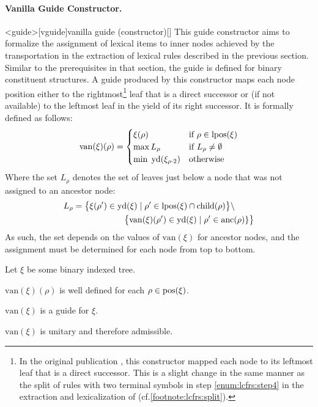 \documentclass[../../document.tex]{subfiles}
\begin{document}
    \paragraph{Vanilla Guide Constructor.}<guide>[vguide]{vanilla guide (constructor)}[]
    This guide constructor aims to formalize the assignment of lexical items to inner nodes achieved by the transportation in the extraction of lexical  rules described in the previous section.
    Similar to the prerequisites in that section, the guide is defined for binary constituent structures.
    A guide produced by this constructor maps each node position either to the rightmost\footnote{
        In the original publication \citep{Rup22}, this constructor mapped each node to its leftmost leaf that is a direct successor.
        This is a slight change in the same manner as the split of rules with two terminal symbols in step \ref{enum:lcfrs:step4} in the extraction and lexicalization of  (cf.\@ \cref{footnote:lcfrs:split}).
    } leaf that is a direct successor or (if not available) to the leftmost leaf in the yield of its right successor.
    It is formally defined as follows:
    \[
    \mathrm{van}(\xi)(\rho) = \begin{cases}
        \xi(\rho)   & \text{if $\rho \in \operatorname{lpos}(\xi)$}\\
        \max L_\rho & \text{if $L_\rho \neq \emptyset$} \\
        \min\;\operatorname{yd}(\xi_{\rho\cdot 2}) &\text{otherwise}
    \end{cases}
    \]
    Where the set \(L_\rho\) denotes the set of leaves just below a node that was not assigned to an ancestor node:
    \begin{align*}
        L_\rho &= \big\{\xi(\rho') \in \operatorname{yd}(\xi) \mid \rho' \in \operatorname{lpos}(\xi) \cap \operatorname{child}(\rho) \big\} \setminus \\
        &\qquad\qquad\qquad  \big\{\mathrm{van}(\xi)(\rho') \in \operatorname{yd}(\xi) \mid \rho' \in \operatorname{anc}(\rho)\} \big\}
    \end{align*}
    As such, the set depends on the values of \(\mathrm{van}(\xi)\) for ancestor nodes, and the assignment must be determined for each node from top to bottom.

    \begin{theorem}
        Let \(\xi\) be some binary indexed tree.
        \begin{compactenum}
            \item \(\mathrm{van}(\xi)(\rho)\) is well defined for each \(\rho \in \operatorname{pos}(\xi)\).
            \item \(\mathrm{van}(\xi)\) is a guide for \(\xi\).
            \item \(\mathrm{van}(\xi)\) is unitary and therefore admissible.
        \end{compactenum}
    \end{theorem}
\end{document}
